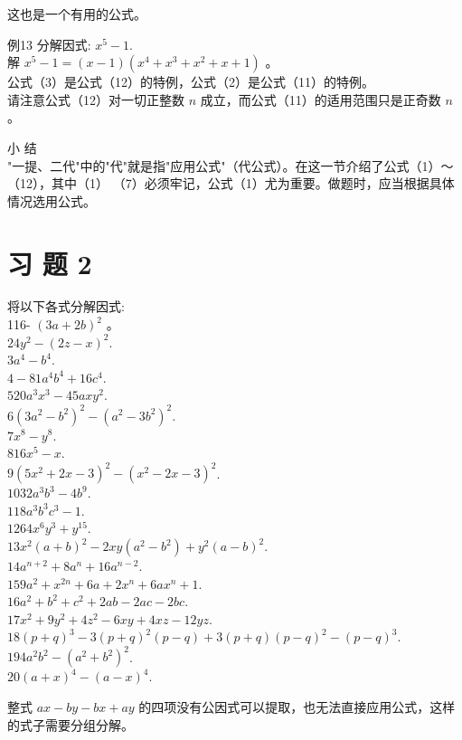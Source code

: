 \documentclass[10pt]{article}
\begin{document}
这也是一个有用的公式。

例13 分解因式: $x^{5}-1$.\\
解 $x^{5}-1=(x-1)\left(x^{4}+x^{3}+x^{2}+x+1\right)$ 。\\
公式（3）是公式（12）的特例，公式（2）是公式（11）的特例。\\
请注意公式（12）对一切正整数 $n$ 成立，而公式（11）的适用范围只是正奇数 $n$ 。

小 结\\
"一提、二代"中的"代"就是指"应用公式"（代公式）。在这一节介绍了公式（1）～（12），其中（1） （7）必须牢记，公式（1）尤为重要。做题时，应当根据具体情况选用公式。

\section*{习 题 2}
将以下各式分解因式:\\
116- $(3 a+2 b)^{2}$ 。\\
$24 y^{2}-(2 z-x)^{2}$.\\
$3 a^{4}-b^{4}$.\\
$4-81 a^{4} b^{4}+16 c^{4}$.\\
$520 a^{3} x^{3}-45 a x y^{2}$.\\
$6\left(3 a^{2}-b^{2}\right)^{2}-\left(a^{2}-3 b^{2}\right)^{2}$.\\
$7 x^{8}-y^{8}$.\\
$816 x^{5}-x$.\\
$9\left(5 x^{2}+2 x-3\right)^{2}-\left(x^{2}-2 x-3\right)^{2}$.\\
$1032 a^{3} b^{3}-4 b^{9}$.\\
$118 a^{3} b^{3} c^{3}-1$.\\
$1264 x^{6} y^{3}+y^{15}$.\\
$13 x^{2}(a+b)^{2}-2 x y\left(a^{2}-b^{2}\right)+y^{2}(a-b)^{2}$.\\
$14 a^{n+2}+8 a^{n}+16 a^{n-2}$.\\
$159 a^{2}+x^{2 n}+6 a+2 x^{n}+6 a x^{n}+1$.\\
$16 a^{2}+b^{2}+c^{2}+2 a b-2 a c-2 b c$.\\
$17 x^{2}+9 y^{2}+4 z^{2}-6 x y+4 x z-12 y z$.\\
$18(p+q)^{3}-3(p+q)^{2}(p-q)+3(p+q)(p-q)^{2}-(p-q)^{3}$.\\
$194 a^{2} b^{2}-\left(a^{2}+b^{2}\right)^{2}$.\\
$20(a+x)^{4}-(a-x)^{4}$.

整式 $a x-b y-b x+a y$ 的四项没有公因式可以提取，也无法直接应用公式，这样的式子需要分组分解。
\end{document}
